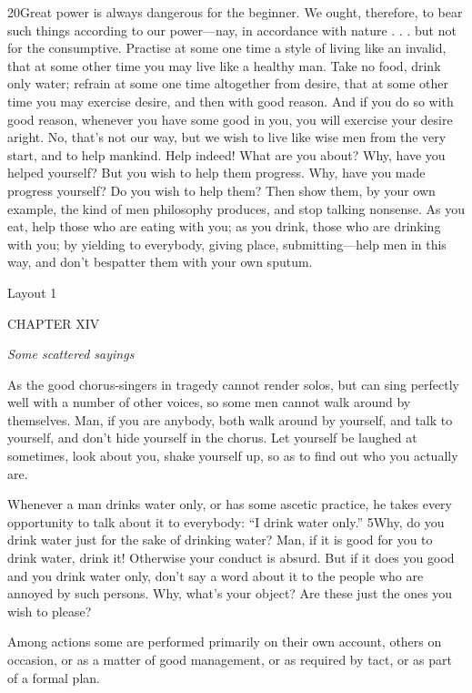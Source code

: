 20Great power is always dangerous for the beginner. We ought, therefore, to bear such things according to our power—nay, in accordance with nature . . . but not for the consumptive. Practise at some one time a style of living like an invalid, that at some other time you may live like a healthy man. Take no food, drink only water; refrain at some one time altogether from desire, that at some other time you may exercise desire, and then with good reason. And if you do so with good reason, whenever you have some good in you, you will exercise your desire aright. No, that's not our way, but we wish to live like wise men from the very start, and to help mankind. Help indeed! What are you about? Why, have you helped yourself? But you wish to help them progress. Why, have you made progress yourself? Do you wish to help them? Then show them, by your own example, the kind of men philosophy produces, and stop talking nonsense. As you eat, help those who are eating with you; as you drink, those who are drinking with you; by yielding to everybody, giving place, submitting—help men in this way, and don't bespatter them with your own sputum.



Layout 1

CHAPTER XIV

\emph{Some scattered sayings}

As the good chorus-singers in tragedy cannot render solos, but can sing perfectly well with a number of other voices, so some men cannot walk around by themselves. Man, if you are anybody, both walk around by yourself, and talk to yourself, and don't hide yourself in the chorus. Let yourself be laughed at sometimes, look about you, shake yourself up, so as to find out who you actually are.

Whenever a man drinks water only, or has some ascetic practice, he takes every opportunity to talk about it to everybody: ``I drink water only.'' 5Why, do you drink water just for the sake of drinking water? Man, if it is good for you to drink water, drink it! Otherwise your conduct is absurd. But if it does you good and you drink water only, don't say a word about it to the people who are annoyed by such persons. Why, what's your object? Are these just the ones you wish to please?

Among actions some are performed primarily on their own account, others on occasion, or as a matter of good management, or as required by tact, or as part of a formal plan.

